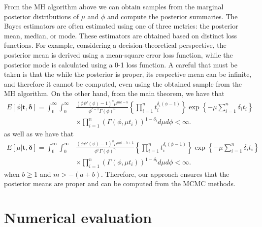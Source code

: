 From the MH algorithm above we can obtain samples from the marginal posterior distributions of $\mu$ and $\phi$ and compute the posterior summaries. The Bayes estimators are often estimated using one of three metrics: the posterior mean, median, or mode. These estimators are obtained based on distinct loss functions. For example, considering a decision-theoretical perspective, the posterior mean is derived using a mean-square error loss function, while the posterior mode is calculated using a 0-1 loss function. A careful that must be taken is that the while the posterior is proper, its respective mean can be infinite, and therefore it cannot be computed, even using the obtained sample from the MH algorithm. On the other hand, from the main theorem, we have that
\begin{equation*}
\begin{aligned}
E[\phi|\boldsymbol{t,\delta}]=\int_0^{\infty}\int_0^{\infty}&\frac{(\phi\psi'(\phi)-1)^{a}\mu^{m\phi-b}}{\phi^{c-1}\Gamma(\phi)^n}\left\{\prod_{i=1}^n{t_i^{\delta_i(\phi-1)}}\right\}\exp\left\{-\mu\sum_{i=1}^n {\delta_i}t_i\right\}\\&\times\prod_{i=1}^n\left(\Gamma(\phi,\mu t_i)\right)^{1-\delta_i} d\mu d\phi<\infty.
\end{aligned}
\end{equation*}
as well as we have that
\begin{equation*}
\begin{aligned}
E[\mu|\boldsymbol{t,\delta}]=\int_0^{\infty}\int_0^{\infty}&\frac{(\phi\psi'(\phi)-1)^{a}\mu^{m\phi-b+1}}{\phi^{c}\Gamma(\phi)^n}\left\{\prod_{i=1}^n{t_i^{\delta_i(\phi-1)}}\right\}\exp\left\{-\mu\sum_{i=1}^n {\delta_i}t_i\right\}\\&\times\prod_{i=1}^n\left(\Gamma(\phi,\mu t_i)\right)^{1-\delta_i} d\mu d\phi<\infty.
\end{aligned}
\end{equation*}
when $b\geq 1$ and $m>-(a+b)$. Therefore, our approach ensures that the posterior means are proper and can be computed from the MCMC methods.



\section{Numerical evaluation}\label{sec:4}


